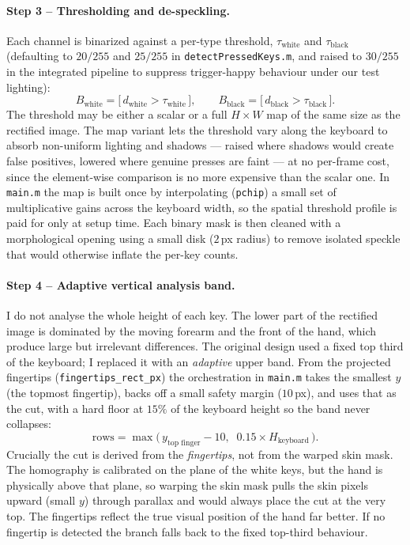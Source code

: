 \documentclass[11pt]{article}
\begin{document}
\paragraph{Step 3 -- Thresholding and de-speckling.}
Each channel is binarized against a per-type threshold, $\tau_{\text{white}}$ and
$\tau_{\text{black}}$ (defaulting to $20/255$ and $25/255$ in
\texttt{detectPressedKeys.m}, and raised to $30/255$ in the integrated pipeline to
suppress trigger-happy behaviour under our test lighting):
\begin{equation}
  B_{\text{white}} = \big[\,d_{\text{white}} > \tau_{\text{white}}\,\big],
  \qquad
  B_{\text{black}} = \big[\,d_{\text{black}} > \tau_{\text{black}}\,\big].
\end{equation}
The threshold may be either a scalar or a full $H\times W$ map of the same size as
the rectified image. The map variant lets the threshold vary along the keyboard to
absorb non-uniform lighting and shadows --- raised where shadows would create false
positives, lowered where genuine presses are faint --- at no per-frame cost, since
the element-wise comparison is no more expensive than the scalar one. In
\texttt{main.m} the map is built once by interpolating (\texttt{pchip}) a small set
of multiplicative gains across the keyboard width, so the spatial threshold profile
is paid for only at setup time. Each binary mask is then cleaned with a
morphological opening using a small disk ($2$\,px radius) to remove isolated
speckle that would otherwise inflate the per-key counts.

\paragraph{Step 4 -- Adaptive vertical analysis band.}
I do not analyse the whole height of each key. The lower part of the rectified
image is dominated by the moving forearm and the front of the hand, which produce
large but irrelevant differences. The original design used a fixed top third of
the keyboard; I replaced it with an \emph{adaptive} upper band. From the projected
fingertips (\texttt{fingertips\_rect\_px}) the orchestration in \texttt{main.m}
takes the smallest $y$ (the topmost fingertip), backs off a small safety margin
($10$\,px), and uses that as the cut, with a hard floor at $15\%$ of the keyboard
height so the band never collapses:
\begin{equation}
  \text{rows} = \max\!\Big(\,y_{\text{top finger}} - 10,\;\;
                 0.15 \times H_{\text{keyboard}}\,\Big).
\end{equation}
Crucially the cut is derived from the \emph{fingertips}, not from the warped skin
mask. The homography is calibrated on the plane of the white keys, but the hand is
physically above that plane, so warping the skin mask pulls the skin pixels
upward (small $y$) through parallax and would always place the cut at the very
top. The fingertips reflect the true visual position of the hand far better. If no
fingertip is detected the branch falls back to the fixed top-third behaviour.
\end{document}
